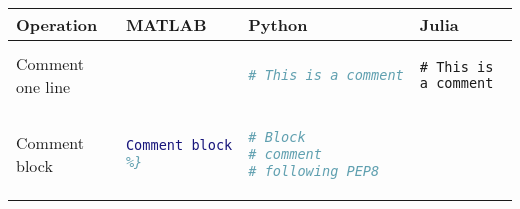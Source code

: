 \documentclass[]{article}
\begin{document}
\begin{longtable}[]{@{}llll@{}}
\toprule
\begin{minipage}[b]{0.19\columnwidth}\raggedright\strut
Operation\strut
\end{minipage} & \begin{minipage}[b]{0.22\columnwidth}\raggedright\strut
MATLAB\strut
\end{minipage} & \begin{minipage}[b]{0.22\columnwidth}\raggedright\strut
Python\strut
\end{minipage} & \begin{minipage}[b]{0.25\columnwidth}\raggedright\strut
Julia\strut
\end{minipage}\tabularnewline
\midrule
\endhead
\begin{minipage}[t]{0.19\columnwidth}\raggedright\strut
Comment one line\strut
\end{minipage} & \begin{minipage}[t]{0.22\columnwidth}\raggedright\strut
\begin{lstlisting}[language=Matlab]
% This is a comment
\end{lstlisting}
\strut
\end{minipage} & \begin{minipage}[t]{0.22\columnwidth}\raggedright\strut
\begin{lstlisting}[language=Python]
# This is a comment
\end{lstlisting}
\strut
\end{minipage} & \begin{minipage}[t]{0.25\columnwidth}\raggedright\strut
\begin{lstlisting}
# This is a comment
\end{lstlisting}
\strut
\end{minipage}\tabularnewline
\begin{minipage}[t]{0.19\columnwidth}\raggedright\strut
Comment block\strut
\end{minipage} & \begin{minipage}[t]{0.22\columnwidth}\raggedright\strut
\begin{lstlisting}[language=Matlab]
%{
Comment block
%}
\end{lstlisting}
\strut
\end{minipage} & \begin{minipage}[t]{0.22\columnwidth}\raggedright\strut
\begin{lstlisting}[language=Python]
# Block
# comment
# following PEP8
\end{lstlisting}

\end{minipage}
\end{longtable}
\end{document}
